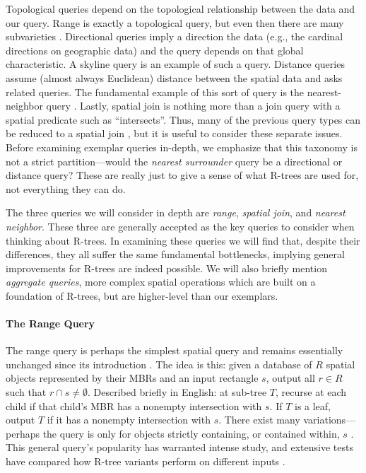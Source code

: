 Topological queries depend on the topological relationship between the data and our query.
Range is exactly a topological query, but even then there are many subvarieties \cite{papadiassellistheodoridisegenhofer95,gaedegunther98}.
Directional queries imply a direction the data (e.g., the cardinal directions on geographic data) and the query depends on that global characteristic.
A skyline query \cite{papadiastaofuseeger05} is an example of such a query.
Distance queries assume (almost always Euclidean) distance between the spatial data and asks related queries.
The fundamental example of this sort of query is the nearest-neighbor query \cite{roussopouloskelleyvincent95}.
Lastly, spatial join is nothing more than a join query with a spatial predicate \cite{brinkhoffkriegelseeger93} such as ``intersects''.
Thus, many of the previous query types can be reduced to a spatial join \cite{tocite}, but it is useful to consider these separate issues.
Before examining exemplar queries in-depth, we emphasize that this taxonomy is not a strict partition---would the \emph{nearest surrounder} query \cite{leeleeleong10} be a directional or distance query?
These are really just to give a sense of what R-trees are used for, not everything they can do.

The three queries we will consider in depth are \emph{range}, \emph{spatial join}, and \emph{nearest neighbor}.
These three are generally accepted as the key queries to consider when thinking about R-trees.
In examining these queries we will find that, despite their differences, they all suffer the same fundamental bottlenecks, implying general improvements for R-trees are indeed possible.
We will also briefly mention \emph{aggregate queries}, more complex spatial operations which are built on a foundation of R-trees, but are higher-level than our exemplars.

\paragraph{The Range Query}
The range query is perhaps the simplest spatial query and remains essentially unchanged since its introduction \cite{guttman84}.
The idea is this: given a database of $R$ spatial objects represented by their MBRs and an input rectangle $s$, output all $r\in R$ such that $r\cap s\neq\emptyset$.
Described briefly in English: at sub-tree $T$, recurse at each child if that child's MBR has a nonempty intersection with $s$.
If $T$ is a leaf, output $T$ if it has a nonempty intersection with $s$.
There exist many variations---perhaps the query is only for objects strictly containing, or contained within, $s$ \cite{gaedegunther98}.
This general query's popularity has warranted intense study, and extensive tests have compared how R-tree variants perform on different inputs \cite{papadiassellistheodoridisegenhofer95}.

